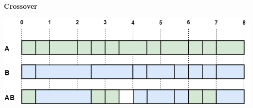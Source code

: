 \documentclass[a0,portrait]{a0poster}
\begin{document}
\begin{multicols}{2}

\begin{flushleft}
	\Large{\textbf{Crossover}}
\end{flushleft}
\vspace{0.1cm}
\begin{center}
	\includegraphics[width=0.9\linewidth]{init}
\end{center}


\end{multicols}
\end{document}

